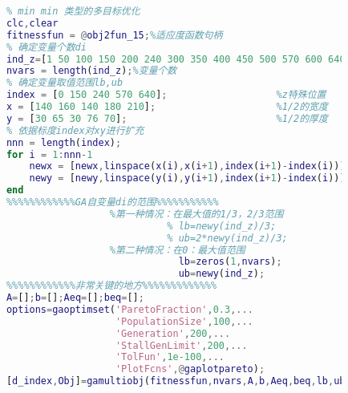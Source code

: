             \begin{lstlisting}[language = Matlab]
            %% 多目标优化IENSGA2的主程序
            % min min 类型的多目标优化
            clc,clear
            fitnessfun = @obj2fun_15;%适应度函数句柄
            % 确定变量个数di
            ind_z=[1 50 100 150 200 240 300 350 400 450 500 570 600 640];
            nvars = length(ind_z);%变量个数
            % 确定变量取值范围lb,ub
            index = [0 150 240 570 640];                   %z特殊位置
            x = [140 160 140 180 210];                     %1/2的宽度
            y = [30 65 30 76 70];                          %1/2的厚度
            % 依据标度index对xy进行扩充
            nnn = length(index);
            for i = 1:nnn-1
                newx = [newx,linspace(x(i),x(i+1),index(i+1)-index(i))];
                newy = [newy,linspace(y(i),y(i+1),index(i+1)-index(i))];
            end
            %%%%%%%%%%%%GA自变量di的范围%%%%%%%%%%%
                              %第一种情况：在最大值的1/3，2/3范围
                                        % lb=newy(ind_z)/3;
                                        % ub=2*newy(ind_z)/3;
                              %第二种情况：在0：最大值范围
                                          lb=zeros(1,nvars);
                                          ub=newy(ind_z);
            %%%%%%%%%%%%非常关键的地方%%%%%%%%%%%%%
            A=[];b=[];Aeq=[];beq=[];
            options=gaoptimset('ParetoFraction',0.3,...
                               'PopulationSize',100,...
                               'Generation',200,...
                               'StallGenLimit',200,...
                               'TolFun',1e-100,...
                               'PlotFcns',@gaplotpareto);
            [d_index,Obj]=gamultiobj(fitnessfun,nvars,A,b,Aeq,beq,lb,ub,options);
            \end{lstlisting}


